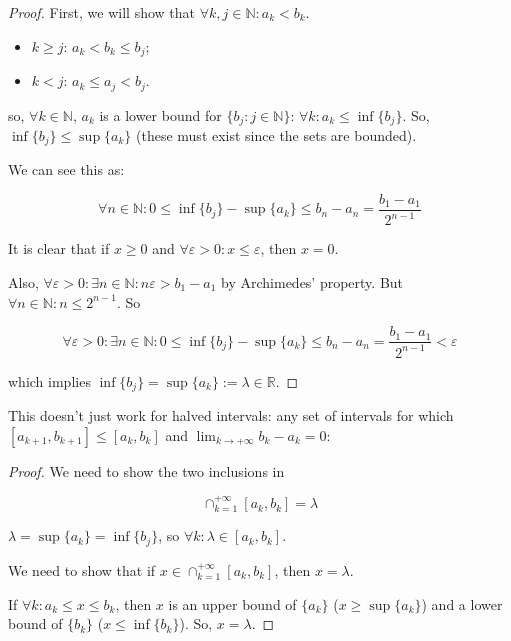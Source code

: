 \documentclass[12pt,a4paper]{report}
\numberwithin{equation}{section}
\theoremstyle{definition}
\theoremstyle{remark}
\begin{document}
\begin{proof}
First, we will show that $\forall k, j \in \mathbb{N}: a_k < b_k$.

\begin{itemize}
\item $k\geq j$: $a_k < b_k \leq b_j$;
\item $k< j$: $a_k \leq a_j < b_j$.
\end{itemize}

so, $\forall k \in \mathbb{N}$, $a_k$ is a lower bound for $\lbrace b_j: j \in \mathbb{N}\rbrace$: $\forall k: a_k \leq \inf \lbrace b_j\rbrace$. So, $\inf \lbrace b_j \rbrace \leq \sup \lbrace a_k \rbrace $ (these must exist since the sets are bounded).

We can see this as:

\begin{equation}
\forall n \in \mathbb{N}: 0 \leq \inf \lbrace b_j \rbrace - \sup \lbrace a_k \rbrace \leq b_n - a_n = \frac{b_1- a_1}{2^{n-1}}
\end{equation}

It is clear that if $x \geq 0$ and $\forall \varepsilon > 0: x \leq \varepsilon$, then $x=0$.

Also, $\forall \varepsilon > 0: \exists n \in \mathbb{N}: n\varepsilon > b_1 - a_1$ by Archimedes' property. But $\forall n \in \mathbb{N}: n \leq 2^{n-1}$. So

\begin{equation}
\forall \varepsilon > 0: \exists n \in \mathbb{N} : 0 \leq \inf \lbrace b_j \rbrace - \sup \lbrace a_k \rbrace \leq b_n - a_n = \frac{b_1- a_1}{2^{n-1}} < \varepsilon
\end{equation}

which implies $ \inf \lbrace b_j \rbrace = \sup \lbrace a_k \rbrace := \lambda \in \mathbb{R}$.
\end{proof}

This doesn't just work for halved intervals: any set of intervals for which $[a_{k+1}, b_{k+1}]\leq [a_k, b_k]$ and $\lim_{k \rightarrow +\infty} b_k - a_k =0$:

\begin{proof}
We need to show the two inclusions in 

\begin{equation}
\cap_{k=1}^{+\infty} [a_k, b_k] = \lambda
\end{equation}

$\lambda = \sup \lbrace a_k \rbrace = \inf \lbrace b_j \rbrace$, so $\forall k: \lambda \in [a_k, b_k]$.

We need to show that if $x \in \cap_{k=1}^{+\infty} [a_k, b_k]$, then $x = \lambda$. 

If $\forall k: a_k \leq x \leq b_k$, then $x$ is an upper bound of $\lbrace a_k \rbrace$ ($x \geq \sup \lbrace a_k \rbrace$) and a lower bound of $\lbrace b_k \rbrace$ ($x \leq \inf \lbrace b_k \rbrace$). So, $x = \lambda$.
\end{proof}
\end{document}
